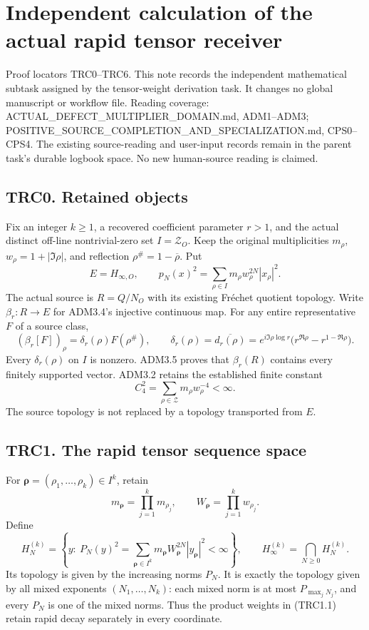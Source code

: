 \section{Independent calculation of the actual rapid tensor
receiver}\label{independent-calculation-of-the-actual-rapid-tensor-receiver}

Proof locators TRC0--TRC6. This note records the independent
mathematical subtask assigned by the tensor-weight derivation task. It
changes no global manuscript or workflow file. Reading coverage:
ACTUAL\_DEFECT\_MULTIPLIER\_DOMAIN.md, ADM1--ADM3;
POSITIVE\_SOURCE\_COMPLETION\_AND\_SPECIALIZATION.md, CPS0--CPS4. The
existing source-reading and user-input records remain in the parent
task's durable logbook space. No new human-source reading is claimed.

\subsection{TRC0. Retained objects}\label{trc0.-retained-objects}

Fix an integer \(k\ge1\), a recovered coefficient parameter \(r>1\), and
the actual distinct off-line nontrivial-zero set \(I=\mathscr Z_O\).
Keep the original multiplicities \(m_\rho\), \(w_\rho=1+|\Im\rho|\), and
reflection \(\rho^\#=1-\overline\rho\). Put \[
E=H_{\infty,O},\qquad p_N(x)^2=\sum_{\rho\in I}m_\rho w_\rho^{2N}|x_\rho|^2.
\] The actual source is \(R=Q/N_O\) with its existing Fréchet quotient
topology. Write \(\beta_r:R\to E\) for ADM3.4's injective continuous
map. For any entire representative \(F\) of a source class, \[
(\beta_r[F])_\rho=\delta_r(\rho)F(\rho^\#),\qquad
\delta_r(\rho)=\overline{d_r(\rho)}
=e^{i\Im\rho\log r}\bigl(r^{\Re\rho}-r^{1-\Re\rho}\bigr).
\tag{TRC0.1}
\] Every \(\delta_r(\rho)\) on \(I\) is nonzero. ADM3.5 proves that
\(\beta_r(R)\) contains every finitely supported vector. ADM3.2 retains
the established finite constant \[
C_4^2=\sum_{\rho\in\mathscr Z}m_\rho w_\rho^{-4}<\infty.
\tag{TRC0.2}
\] The source topology is not replaced by a topology transported from
\(E\).

\subsection{TRC1. The rapid tensor sequence
space}\label{trc1.-the-rapid-tensor-sequence-space}

For \(\boldsymbol\rho=(\rho_1,\ldots,\rho_k)\in I^k\), retain \[
m_{\boldsymbol\rho}=\prod_{j=1}^k m_{\rho_j},\qquad
W_{\boldsymbol\rho}=\prod_{j=1}^k w_{\rho_j}.
\] Define \[
H_N^{(k)}=\left\{y:\ P_N(y)^2=
\sum_{\boldsymbol\rho\in I^k}m_{\boldsymbol\rho}
W_{\boldsymbol\rho}^{2N}|y_{\boldsymbol\rho}|^2<\infty\right\},
\qquad H_\infty^{(k)}=\bigcap_{N\ge0}H_N^{(k)}.
\tag{TRC1.1}
\] Its topology is given by the increasing norms \(P_N\). It is exactly
the topology given by all mixed exponents \((N_1,\ldots,N_k)\): each
mixed norm is at most \(P_{\max_jN_j}\), and every \(P_N\) is one of the
mixed norms. Thus the product weights in (TRC1.1) retain rapid decay
separately in every coordinate.

